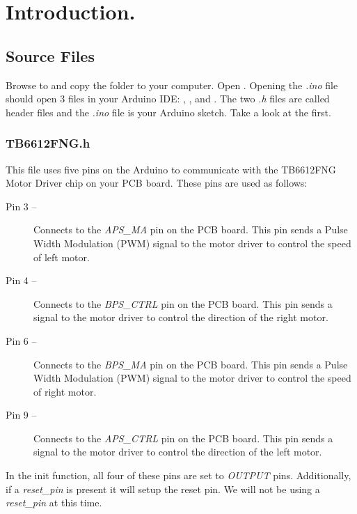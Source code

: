\documentclass{handout}
\begin{document}
	\newpage
	\clearpage
	\pagebreak
	
	\section{Introduction.}
	
	\subsection{Source Files}
	Browse to  and copy the  folder to your computer. Open . Opening the \textit{.ino} file should open 3 files in your Arduino IDE: , , and . The two \textit{.h} files are called header files and the \textit{.ino} file is your Arduino sketch. Take a look at the  first.
	
	\subsubsection{TB6612FNG.h}
	This file uses five pins on the Arduino to communicate with the TB6612FNG Motor Driver chip on your PCB board. These pins are used as follows:
	
	\begin{description}
		\item[Pin 3 --] Connects to the \textit{APS\_MA} pin on the PCB board. This pin sends a Pulse Width Modulation (PWM) signal to the motor driver to control the speed of left motor.
		\item[Pin 4 --] Connects to the \textit{BPS\_CTRL} pin on the PCB board. This pin sends a signal to the motor driver to control the direction of the right motor.
		\item[Pin 6 --] Connects to the \textit{BPS\_MA} pin on the PCB board. This pin sends a Pulse Width Modulation (PWM) signal to the motor driver to control the speed of right motor.
		\item[Pin 9 --] Connects to the \textit{APS\_CTRL} pin on the PCB board. This pin sends a signal to the motor driver to control the direction of the left motor.
	\end{description}
	
	In the init function, all four of these pins are set to \textit{OUTPUT} pins. Additionally, if a \textit{reset\_pin} is present it will setup the reset pin. We will not be using a \textit{reset\_pin} at this time.
	
\end{document}

